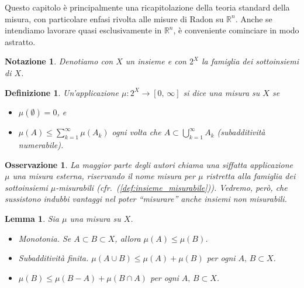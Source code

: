 \documentclass[a4paper,10pt,openright,oneside]{book}
\theoremstyle{theoremstyle}
\newtheorem{lemma}[teorema]{Lemma}
\theoremstyle{theoremstylewoheader}
\theoremstyle{theoremstyle}
\newtheorem{definizione}[teorema]{Definizione}
\newtheorem{notazione}[teorema]{Notazione}
\newtheorem{osservazione}[teorema]{Osservazione}
\theoremstyle{proofsecstyle}
\theoremstyle{nonumberplain}
\newcommand{\RR}{\ensuremath{\mathbb{R}}}
\begin{document}
Questo capitolo è principalmente una ricapitolazione della teoria standard della misura, con particolare enfasi rivolta alle misure di Radon su $\RR^n$. Anche se intendiamo lavorare quasi esclusivamente in $\RR^n$, è conveniente cominciare in modo astratto.

\begin{notazione}
Denotiamo con $X$ un insieme e con $2^X$ la famiglia dei sottoinsiemi di $X$.
\end{notazione}

\begin{definizione}
\label{def:misura}
Un'applicazione $\mu: 2^X \rightarrow [0,\, \infty]$ si dice una \emph{misura} su $X$ se
\begin{itemize}
\item[(i)] $\mu(\emptyset) = 0$, e
\item[(ii)] $\mu(A) \le \sum_{k=1}^{\infty} \mu(A_k)$ ogni volta che $A \subset \bigcup_{k=1}^{\infty} A_k$ (\emph{subadditività numerabile}).
\end{itemize}
\end{definizione}

\begin{osservazione}
La maggior parte degli autori chiama una siffatta applicazione $\mu$ una misura \emph{esterna}, riservando il nome \emph{misura} per $\mu$ ristretta alla famiglia dei sottoinsiemi $\mu$-misurabili (\emph{cfr.}~(\ref{def:insieme_misurabile})). Vedremo, però, che sussistono indubbi vantaggi nel poter ``misurare'' anche insiemi non misurabili.
\end{osservazione}

\begin{lemma}
Sia $\mu$ una misura su $X$.
\begin{itemize}
\item[(i)] \emph{Monotonia.} Se $A \subset B \subset X$, allora $\mu(A) \le \mu(B)$.
\item[(ii)] \emph{Subadditività finita.} $\mu(A \cup B) \le \mu(A) + \mu(B)$ per ogni $A,\, B \subset X$.
\item[(iii)] $\mu(B) \le \mu(B - A) + \mu(B \cap A)$ per ogni $A,\, B \subset X$.
\end{itemize}
\end{lemma}
\end{document}
